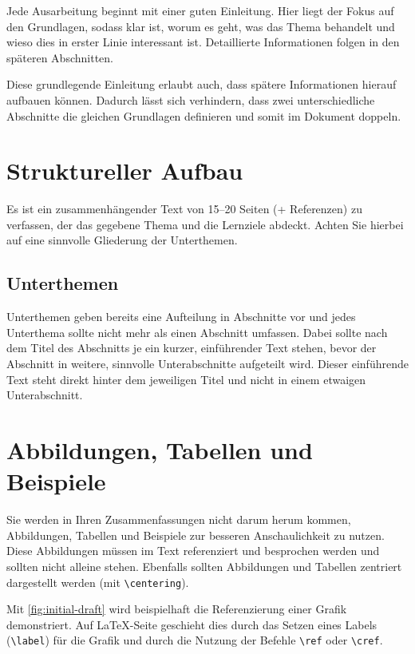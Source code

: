 \documentclass{hhuarticle}
\begin{document}
  Jede Ausarbeitung beginnt mit einer guten Einleitung.
  Hier liegt der Fokus auf den Grundlagen,
  sodass klar ist, worum es geht, was das Thema behandelt und
  wieso dies in erster Linie interessant ist.
  Detaillierte Informationen folgen in den späteren Abschnitten.

  Diese grundlegende Einleitung erlaubt auch,
  dass spätere Informationen hierauf aufbauen können.
  Dadurch lässt sich verhindern,
  dass zwei unterschiedliche Abschnitte die gleichen Grundlagen definieren
  und somit im Dokument doppeln.


  \section{Struktureller Aufbau}

  Es ist ein zusammenhängender Text von 15--20 Seiten (+ Referenzen) zu verfassen,
  der das gegebene Thema und die Lernziele abdeckt.
  Achten Sie hierbei auf eine sinnvolle Gliederung der Unterthemen.

  \subsection{Unterthemen}
  Unterthemen geben bereits eine Aufteilung in Abschnitte vor und jedes
  Unterthema sollte nicht mehr als einen Abschnitt umfassen.
  Dabei sollte nach dem Titel des Abschnitts je ein
  kurzer, einführender Text stehen, bevor der Abschnitt in weitere,
  sinnvolle Unterabschnitte aufgeteilt wird.
  Dieser einführende Text steht direkt hinter dem jeweiligen Titel und
  nicht in einem etwaigen Unterabschnitt.


  \section{Abbildungen, Tabellen und Beispiele}

  Sie werden in Ihren Zusammenfassungen nicht darum herum kommen,
  Abbildungen, Tabellen und Beispiele zur besseren Anschaulichkeit zu nutzen.
  Diese Abbildungen müssen im Text referenziert und besprochen werden
  und sollten nicht alleine stehen.
  Ebenfalls sollten Abbildungen und Tabellen zentriert dargestellt werden
  (mit \texttt{\textbackslash centering}).

  Mit \cref{fig:initial-draft} wird beispielhaft die Referenzierung einer Grafik
  demonstriert.
  Auf \LaTeX-Seite geschieht dies durch das Setzen eines Labels
  (\texttt{\textbackslash label}) für die Grafik
  und durch die Nutzung der Befehle
  \texttt{\textbackslash ref} oder \texttt{\textbackslash cref}.
\end{document}
